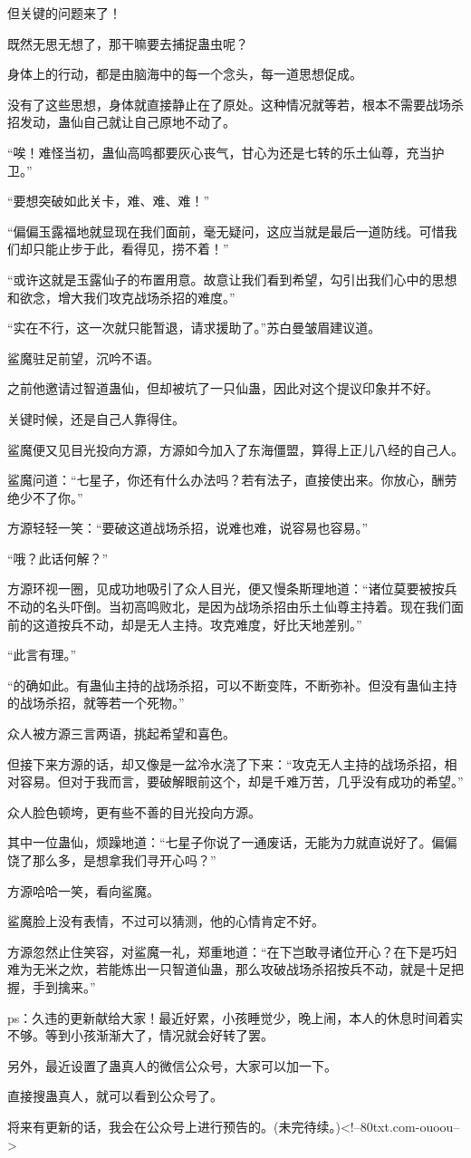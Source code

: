 \begin{this_body}
但关键的问题来了！

既然无思无想了，那干嘛要去捕捉蛊虫呢？

身体上的行动，都是由脑海中的每一个念头，每一道思想促成。

没有了这些思想，身体就直接静止在了原处。这种情况就等若，根本不需要战场杀招发动，蛊仙自己就让自己原地不动了。

“唉！难怪当初，蛊仙高鸣都要灰心丧气，甘心为还是七转的乐土仙尊，充当护卫。”

“要想突破如此关卡，难、难、难！”

“偏偏玉露福地就显现在我们面前，毫无疑问，这应当就是最后一道防线。可惜我们却只能止步于此，看得见，捞不着！”

“或许这就是玉露仙子的布置用意。故意让我们看到希望，勾引出我们心中的思想和欲念，增大我们攻克战场杀招的难度。”

“实在不行，这一次就只能暂退，请求援助了。”苏白曼皱眉建议道。

鲨魔驻足前望，沉吟不语。

之前他邀请过智道蛊仙，但却被坑了一只仙蛊，因此对这个提议印象并不好。

关键时候，还是自己人靠得住。

鲨魔便又见目光投向方源，方源如今加入了东海僵盟，算得上正儿八经的自己人。

鲨魔问道：“七星子，你还有什么办法吗？若有法子，直接使出来。你放心，酬劳绝少不了你。”

方源轻轻一笑：“要破这道战场杀招，说难也难，说容易也容易。”

“哦？此话何解？”

方源环视一圈，见成功地吸引了众人目光，便又慢条斯理地道：“诸位莫要被按兵不动的名头吓倒。当初高鸣败北，是因为战场杀招由乐土仙尊主持着。现在我们面前的这道按兵不动，却是无人主持。攻克难度，好比天地差别。”

“此言有理。”

“的确如此。有蛊仙主持的战场杀招，可以不断变阵，不断弥补。但没有蛊仙主持的战场杀招，就等若一个死物。”

众人被方源三言两语，挑起希望和喜色。

但接下来方源的话，却又像是一盆冷水浇了下来：“攻克无人主持的战场杀招，相对容易。但对于我而言，要破解眼前这个，却是千难万苦，几乎没有成功的希望。”

众人脸色顿垮，更有些不善的目光投向方源。

其中一位蛊仙，烦躁地道：“七星子你说了一通废话，无能为力就直说好了。偏偏饶了那么多，是想拿我们寻开心吗？”

方源哈哈一笑，看向鲨魔。

鲨魔脸上没有表情，不过可以猜测，他的心情肯定不好。

方源忽然止住笑容，对鲨魔一礼，郑重地道：“在下岂敢寻诸位开心？在下是巧妇难为无米之炊，若能炼出一只智道仙蛊，那么攻破战场杀招按兵不动，就是十足把握，手到擒来。”

ps：久违的更新献给大家！最近好累，小孩睡觉少，晚上闹，本人的休息时间着实不够。等到小孩渐渐大了，情况就会好转了罢。

另外，最近设置了蛊真人的微信公众号，大家可以加一下。

直接搜蛊真人，就可以看到公众号了。

将来有更新的话，我会在公众号上进行预告的。(未完待续。)<!--80txt.com-ouoou-->

\end{this_body}

